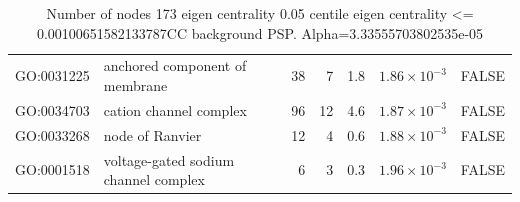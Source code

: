 \begin{table}[ht]
\begin{adjustbox}{max width=\textwidth}
\begin{tabular}{llrrrrl}
  GO:0031225 & anchored component of membrane & 38 & 7 & 1.8 & $1.86 \times 10^{-3}$ & FALSE \\ 
  GO:0034703 & cation channel complex & 96 & 12 & 4.6 & $1.87 \times 10^{-3}$ & FALSE \\ 
  GO:0033268 & node of Ranvier & 12 & 4 & 0.6 & $1.88 \times 10^{-3}$ & FALSE \\ 
  GO:0001518 & voltage-gated sodium channel complex & 6 & 3 & 0.3 & $1.96 \times 10^{-3}$ & FALSE \\ 
   \hline
\end{tabular}
\end{adjustbox}
\caption{Number of nodes 173 eigen centrality 0.05 centile  eigen centrality <= 0.00100651582133787CC background PSP. Alpha=3.33555703802535e-05} 
\label{tab:Number of nodes 173 eigen centrality 0.05 centile  eigen centrality <= 0.00100651582133787CC background PSP. Alpha=3.33555703802535e-05}
\end{table}

